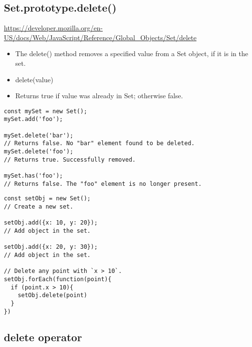 \documentclass[10pt]{article}
\begin{document}
\medskip %








\medskip %
\pagebreak
\subsection{Set.prototype.delete()}

\url{https://developer.mozilla.org/en-US/docs/Web/JavaScript/Reference/Global_Objects/Set/delete}

\begin{itemize}
	\item The delete() method removes a specified value from a Set object, if it is in the set.
	\item delete(value)
	\item Returns true if value was already in Set; otherwise false.
\end{itemize}

\begin{lstlisting}[title=Examples using delete(), captionpos=t]
const mySet = new Set();
mySet.add('foo');

mySet.delete('bar'); 
// Returns false. No "bar" element found to be deleted.
mySet.delete('foo');
// Returns true. Successfully removed.

mySet.has('foo');    
// Returns false. The "foo" element is no longer present.
\end{lstlisting}

\begin{lstlisting}[title=Examples using delete(), captionpos=t]
const setObj = new Set();   
// Create a new set.

setObj.add({x: 10, y: 20}); 
// Add object in the set.

setObj.add({x: 20, y: 30}); 
// Add object in the set.

// Delete any point with `x > 10`.
setObj.forEach(function(point){
  if (point.x > 10){
    setObj.delete(point)
  }
})
\end{lstlisting}

\medskip %









\medskip %
\pagebreak
\subsection{delete operator}
\end{document}
